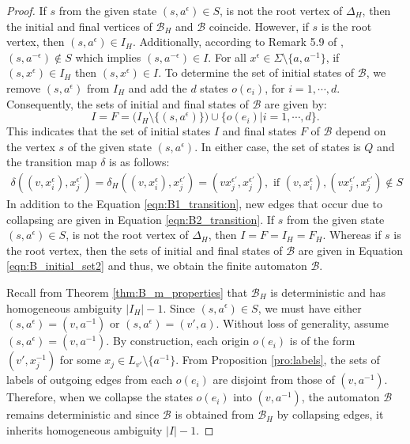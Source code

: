 \documentclass{article}
\newcommand{\B}{\mathcal{B}}
\newcommand{\e}{\epsilon}
\begin{document}
\begin{proof}
    If $s$ from the given state $(s,a^{\e}) \in S$, is not the root vertex of $\Delta_H$, then the initial and final vertices of $\B_H$ and $\B$ coincide. However, if $s$ is the root vertex, then $(s,a^{\e}) \in I_H$. Additionally, according to Remark 5.9 of \cite{ascari2021fine}, $(s,a^{-\e}) \notin S$ which implies $(s,a^{-\e}) \in I.$ For all $x^{\e} \in \Sigma \setminus \{a, a^{-1}\}$, if $(s,x^{\e}) \in I_H$ then $(s,x^{\e}) \in I.$ To determine the set of initial states of $\B$, we remove $(s,a^{\e})$ from $I_H$ and add the $d$ states $o(e_i)$, for $i = 1,\cdots,d$. Consequently, the sets of initial and final states of $\B$ are given by:
    \begin{equation}
        I = F = \bigl(I_H \setminus \{(s,a^{\e})\} \bigr)\cup \bigl\{o(e_i) | i = 1,\cdots,d\bigr\}. \label{eqn:B_initial_set2}
    \end{equation}
    This indicates that the set of initial states $I$ and final states $F$ of $\B$ depend on the vertex $s$ of the given state $(s,a^{\e}).$ In either case, the set of states is $Q$ and the transition map $\delta$ is as follows:
    \begin{gather}
    \delta\left((v,x_i^{\e}),x_j^{\e'}\right) = \delta_H\left((v,x_i^{\e}),x_j^{\e'}\right) = (vx_j^{\e'},x_j^{\e'}), \textrm{ if } (v,x_i^{\e}), (vx_j^{\e'},x_j^{\e'}) \notin S   \label{eqn:B1_transition}
    \end{gather}
    In addition to the Equation \eqref{eqn:B1_transition}, new edges that occur due to collapsing are given in Equation \eqref{eqn:B2_transition}. 
    If $s$ from the given state $(s,a^{\e}) \in S$, is not the root vertex of $\Delta_H$, then $I = F = I_H = F_H.$ Whereas if $s$ is the root vertex, then the sets of initial and final states of $\B$ are given in Equation \eqref{eqn:B_initial_set2} and thus, we obtain the finite automaton $\B.$
    
    Recall from Theorem \ref{thm:B_m_properties} that $\B_H$ is deterministic and has homogeneous ambiguity $|I_H| - 1$. Since $(s, a^{\epsilon}) \in S$, we must have either $(s, a^{\epsilon}) = (v, a^{-1})$ or $(s, a^{\epsilon}) = (v', a)$. Without loss of generality, assume $(s, a^{\epsilon}) = (v, a^{-1})$. By construction, each origin $o(e_i)$ is of the form $(v', x_j^{-1})$ for some $x_j \in L_{v'} \setminus \{a^{-1}\}$. From Proposition \ref{pro:labels}, the sets of labels of outgoing edges from each $o(e_i)$ are disjoint from those of $(v, a^{-1})$. Therefore, when we collapse the states $o(e_i)$ into $(v, a^{-1})$, the automaton $\B$ remains deterministic and since $\B$ is obtained from $\B_H$ by collapsing edges, it inherits homogeneous ambiguity $|I| - 1$.


\end{proof}
\end{document}
